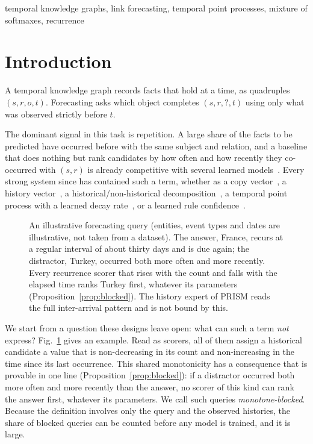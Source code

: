 \documentclass[conference]{IEEEtran}
\begin{document}
\begin{IEEEkeywords}
temporal knowledge graphs, link forecasting, temporal point processes,
mixture of softmaxes, recurrence
\end{IEEEkeywords}

\section{Introduction}
\label{sec:intro}

A temporal knowledge graph records facts that hold at a time, as quadruples
$(s,r,o,t)$. Forecasting asks which object completes $(s,r,?,t)$ using only
what was observed strictly before $t$.

The dominant signal in this task is repetition. A large share of the facts to
be predicted have occurred before with the same subject and relation, and a
baseline that does nothing but rank candidates by how often and how recently
they co-occurred with $(s,r)$ is already competitive with several learned
models~\cite{historyrepeats,cygnet}. Every strong system since has contained
such a term, whether as a copy vector~\cite{cygnet}, a history
vector~\cite{regcn,tirgn}, a historical/non-historical
decomposition~\cite{cenet}, a temporal point process with a learned decay
rate~\cite{gattnhp}, or a learned rule confidence~\cite{counttrucola}.

\begin{figure}[t]
\centering

\caption{An illustrative forecasting query (entities, event types and dates
are illustrative, not taken from a dataset). The answer, France, recurs at a
regular interval of about thirty days and is due again; the distractor,
Turkey, occurred both more often and more recently. Every recurrence scorer
that rises with the count and falls with the elapsed time ranks Turkey first,
whatever its parameters (Proposition~\ref{prop:blocked}). The history expert
of PRISM reads the full inter-arrival pattern and is not bound by this.}
\label{fig:intro}
\end{figure}

We start from a question these designs leave open: what can such a term
\emph{not} express? Fig.~\ref{fig:intro} gives an example. Read as scorers, all of them assign a historical candidate
a value that is non-decreasing in its count and non-increasing in the time
since its last occurrence. This shared monotonicity has a consequence that is
provable in one line (Proposition~\ref{prop:blocked}): if a distractor occurred
both more often and more recently than the answer, no scorer of this kind can
rank the answer first, whatever its parameters. We call such queries
\emph{monotone-blocked}. Because the definition involves only the query and the
observed histories, the share of blocked queries can be counted before any
model is trained, and it is large.
\end{document}
